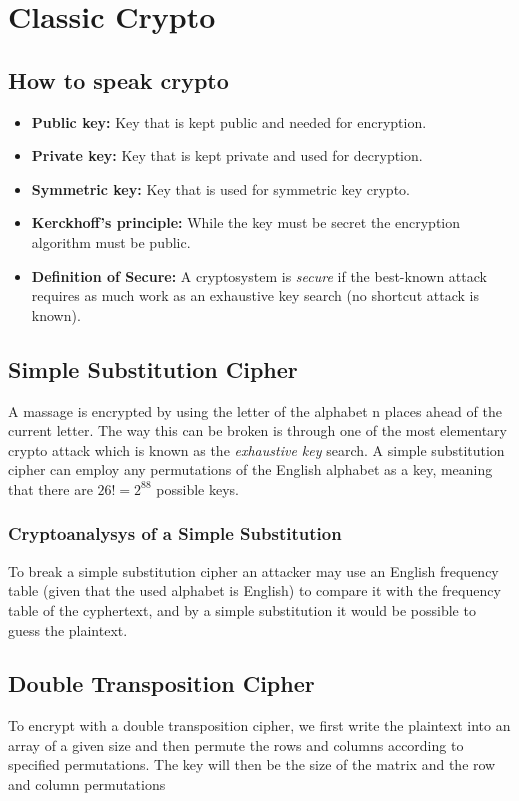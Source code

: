 \documentclass{article}
\begin{document}
\newpage
\section{Classic Crypto}

\subsection{How to speak crypto}
\begin{itemize}
    \item \textbf{Public key:} Key that is kept public and needed for encryption.
    \item \textbf{Private key:} Key that is kept private and used for decryption.
    \item \textbf{Symmetric key:} Key that is used for symmetric key crypto.
    \item \textbf{Kerckhoff's principle:} While the key must be secret the encryption algorithm must be public.
    \item \textbf{Definition of Secure:} A cryptosystem is \textit{secure} if the best-known attack requires as much work as an exhaustive key search (no shortcut attack is known).
\end{itemize}

\subsection{Simple Substitution Cipher}
A massage is encrypted by using the letter of the alphabet n places ahead of the current letter. The way this can be broken is through one of the most elementary crypto attack which is known as the \textit{exhaustive key} search. A simple substitution cipher can employ any permutations of the English alphabet as a key, meaning that there are $26! = 2^{88}$ possible keys.

\subsubsection{Cryptoanalysys of a Simple Substitution}
To break a simple substitution cipher an attacker may use an English frequency table (given that the used alphabet is English) to compare it with the frequency table of the cyphertext, and by a simple substitution it would be possible to guess the plaintext. 

\subsection{Double Transposition Cipher}
To encrypt with a double transposition cipher, we first write the plaintext into an array of a given size and then permute the rows and columns according to specified permutations. The key will then be the size of the matrix and the row and column permutations
\end{document}

